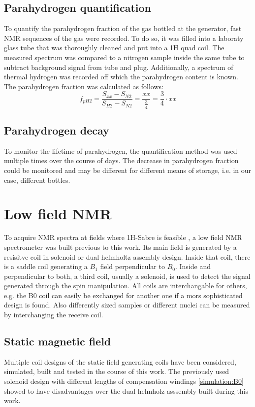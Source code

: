         \subsection{Parahydrogen quantification}
            To quantify the parahydrogen fraction of the gas bottled at the generator, fast NMR sequences of the gas were recorded. To do so, it was filled into a laboraty glass tube that was thoroughly cleaned and put into a 1H quad coil. The measured spectrum was compared to a nitrogen sample inside the same tube to subtract background signal from tube and plug. Additionally, a spectrum of thermal hydrogen was recorded off which the parahydrogen content is known. The parahydrogen fraction was calculated as follows: 
            \begin{equation}
                f_{pH2} = \frac{S_{xx}-S_{N2}}{S_{H2}-S_{N2}} = \frac{xx}{\tfrac{3}{4}} = \frac{3}{4} \cdot xx
            \end{equation}
        \subsection{Parahydrogen decay}
            To monitor the lifetime of parahydrogen, the quantification method was used multiple times over the course of days. The decrease in parahydrogen fraction could be monitored and may be different for different means of storage, i.e. in our case, different bottles.
    \section{Low field NMR}
        To acquire NMR spectra at fields where 1H-Sabre is feasible , a low field NMR spectrometer was built  previous to this work. Its main field is generated by a resisitve coil in solenoid or dual helmholtz assembly design. Inside that coil, there is a saddle coil generating a $B_1$ field perpendicular to $B_0$. Inside and perpendicular to both, a third coil, usually a solenoid, is used to detect the signal generated through the spin manipulation. All coils are interchangable for others, e.g. the B0 coil can easily be exchanged for another one if a mors sophisticated design is found. Also differently sized samples or different nuclei can be measured by interchanging the receive coil.
        \subsection{Static magnetic field}
            Multiple coil designs of the static field generating coils have been  considered, simulated, built and tested in the course of this work. The previously used solenoid design with different lengths of compensation windings \ref{simulation:B0} showed to have disadvantages over the dual helmholz asssembly built during this work.
